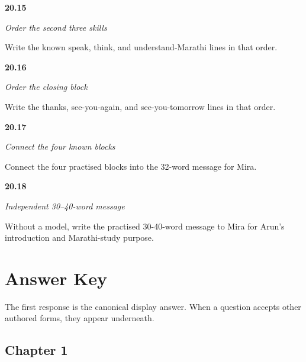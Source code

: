 \noindent\begin{minipage}[t]{\linewidth}
\raggedright
\hypertarget{review-MR-A1M15-skills-block-two-check}{\textbf{20.15}} \emph{Order the second three skills}\par
\small Write the known speak, think, and understand-Marathi lines in that order.
\end{minipage}\par\medskip

\noindent\begin{minipage}[t]{\linewidth}
\raggedright
\hypertarget{review-MR-A1M16-closing-block-check}{\textbf{20.16}} \emph{Order the closing block}\par
\small Write the thanks, see-you-again, and see-you-tomorrow lines in that order.
\end{minipage}\par\medskip

\noindent\begin{minipage}[t]{\linewidth}
\raggedright
\hypertarget{review-MR-A1M17-guided-message-check}{\textbf{20.17}} \emph{Connect the four known blocks}\par
\small Connect the four practised blocks into the 32-word message for Mira.
\end{minipage}\par\medskip

\noindent\begin{minipage}[t]{\linewidth}
\raggedright
\hypertarget{review-MR-A1M18-independent-message-check}{\textbf{20.18}} \emph{Independent 30–40-word message}\par
\small Without a model, write the practised 30-40-word message to Mira for Arun's introduction and Marathi-study purpose.
\end{minipage}\par\medskip

\chapter*{Answer Key}

The first response is the canonical display answer. When a question accepts other authored forms, they appear underneath.

\section*{Chapter 1}

